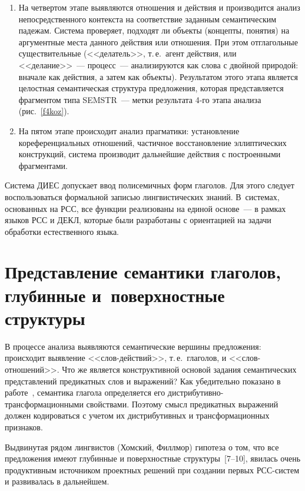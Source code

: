 \begin{multicols}{2}
\begin{enumerate}[1.]
\begin{figure*}[b]
      \end{figure*}      
     \item На четвертом этапе выявляются отношения и действия и 
производится анализ непосредственного контекста на соответствие заданным 
семантическим падежам. Система проверяет, подходят ли объекты 
(концепты, понятия) на аргументные места данного действия или отношения. 
При этом отглагольные существительные (<<делатель>>, т.\,е.\ агент 
действия, или <<делание>>~--- процесс~--- анализируются как слова с 
двойной природой: вначале как действия, а затем как объекты). Результатом 
этого этапа является целостная семантическая структура предложения, 
которая представляется фрагментом типа SEMSTR~--- метки результата 4-го 
этапа анализа (рис.~\ref{f4koz}).
     \item На пятом этапе происходит анализ прагматики: установление 
кореференциальных отношений, частичное восстановление эллиптических 
конструкций, система производит дальнейшие действия с построенными 
фрагментами.
     \end{enumerate}

     
Система ДИЕС допускает ввод полисемичных форм глаголов. Для этого следует 
воспользоваться формальной записью лингвистических знаний. 
     В~сис\-те\-мах, основанных на РСС, все функции реализованы на 
единой основе~--- в рамках языков РСС и ДЕКЛ, которые были разработаны 
с ориентацией на задачи обработки естественного языка.


\section{Представление семантики глаголов, глубинные 
и~поверхностные структуры}
     
     В процессе анализа выявляются семантические вершины предложения: 
происходит выявление <<слов-дей\-ст\-вий>>, т.\,е.\ глаголов, и 
     <<слов-от\-но\-ше\-ний>>. Что же является конструктивной основой\linebreak 
задания семантических представлений предикатных слов и выражений? Как 
убедительно показано в работе~\cite{4koz}, семантика глагола 
определяется его дис\-три\-бу\-тив\-но-транс\-фор\-ма\-ци\-он\-ны\-ми\linebreak 
свойствами. Поэтому смысл предикатных выражений должен кодироваться с 
учетом их дистрибутивных и трансформационных признаков. 
     
     Выдвинутая рядом лингвистов (Хомский, Филлмор) гипотеза о том, что 
все предложения имеют глубинные и поверхностные 
     структуры~[7--10], явилась очень продуктивным 
источником проектных решений при создании первых РСС-сис\-тем и 
развивалась в дальнейшем. 


\end{multicols}
